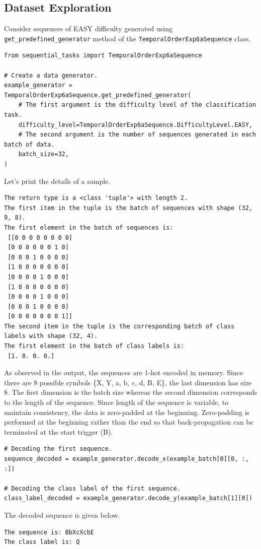 \subsection{Dataset Exploration}
Consider sequences of EASY difficulty generated using \texttt{get\_predefined\_generator} method of the \texttt{TemporalOrderExp6aSequence} class.
\begin{verbatim}
from sequential_tasks import TemporalOrderExp6aSequence

# Create a data generator.
example_generator = TemporalOrderExp6aSequence.get_predefined_generator(
    # The first argument is the difficulty level of the classification task.
    difficulty_level=TemporalOrderExp6aSequence.DifficultyLevel.EASY,
    # The second argument is the number of sequences generated in each batch of data.
    batch_size=32,
)
\end{verbatim}
Let's print the details of a sample.
\begin{verbatim}
The return type is a <class 'tuple'> with length 2.
The first item in the tuple is the batch of sequences with shape (32, 9, 8).
The first element in the batch of sequences is:
 [[0 0 0 0 0 0 0 0]
 [0 0 0 0 0 0 1 0]
 [0 0 0 1 0 0 0 0]
 [1 0 0 0 0 0 0 0]
 [0 0 0 0 1 0 0 0]
 [1 0 0 0 0 0 0 0]
 [0 0 0 0 1 0 0 0]
 [0 0 0 1 0 0 0 0]
 [0 0 0 0 0 0 0 1]]
The second item in the tuple is the corresponding batch of class labels with shape (32, 4).
The first element in the batch of class labels is:
 [1. 0. 0. 0.]
\end{verbatim}
As observed in the output, the sequences are 1-hot encoded in memory. Since there are 8 possible symbols \{X, Y, a, b, c, d, B, E\}, the last dimension has size 8. 
The first dimension is the batch size whereas the second dimension corresponds to the length of the sequence. 
Since length of the sequence is variable, to maintain consistency, the data is zero-padded at the beginning. 
Zero-padding is performed at the beginning rather than the end so that back-propagation can be terminated at the start trigger (B).

\begin{verbatim}
# Decoding the first sequence.
sequence_decoded = example_generator.decode_x(example_batch[0][0, :, :])

# Decoding the class label of the first sequence.
class_label_decoded = example_generator.decode_y(example_batch[1][0])
\end{verbatim}
The decoded sequence is given below.
\begin{verbatim}
The sequence is: BbXcXcbE
The class label is: Q
\end{verbatim}

